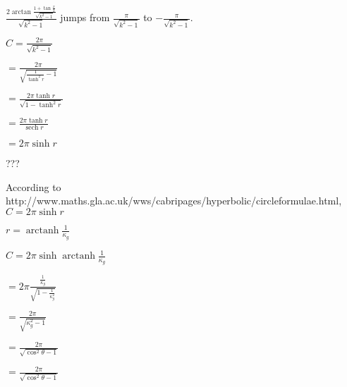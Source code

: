 \documentclass[12pt]{amsart}
\DeclareMathOperator*{\arctanh}{arctanh}
\DeclareMathOperator*{\sech}{sech}
\begin{document}
$\frac{2\arctan \frac{1 + \tan\frac{x}{2}}{\sqrt{k^2-1}}}{\sqrt{k^2-1}}$ jumps from $\frac{\pi}{\sqrt{k^2-1}}$ to $-\frac{\pi}{\sqrt{k^2-1}}$.

$C = \frac{2\pi}{\sqrt{k^2-1}}$

$= \frac{2\pi}{\sqrt{\frac{1}{\tanh^2 r}-1}}$

$= \frac{2\pi\tanh r}{\sqrt{1-\tanh^2 r}}$

$= \frac{2\pi\tanh r}{\sech r}$

$= 2\pi\sinh r$

???

According to http://www.maths.gla.ac.uk/wws/cabripages/hyperbolic/circleformulae.html, $C = 2\pi\sinh r$

$r = \arctanh\frac{1}{\kappa_g}$

$C = 2\pi\sinh\arctanh\frac{1}{\kappa_g}$

$= 2\pi\frac{\frac{1}{\kappa_g}}{\sqrt{1-\frac{1}{\kappa_g^2}}}$

$= \frac{2\pi}{\sqrt{\kappa_g^2-1}}$

$= \frac{2\pi}{\sqrt{\cos^2\theta-1}}$

$= \frac{2\pi}{\sqrt{\cos^2\theta-1}}$
\end{document}
